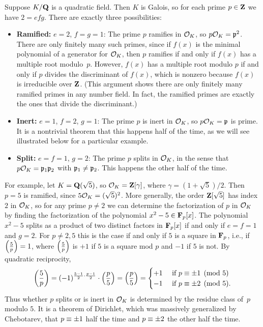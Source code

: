 Suppose $K/\mathbf{Q}$ is a quadratic field.  Then $K$ is Galois, so for each prime $p\in\mathbf{Z}$ we have
$2=efg$. There are exactly three possibilities:
\begin{itemize}
\item {\bf Ramified:} $e=2$, $f=g=1$: The prime $p$ ramifies in
  $\mathcal{O}_K$, so $p\mathcal{O}_K = \mathfrak{p}^2$.  There are only finitely many such
  primes, since if $f(x)$ is the minimal polynomial of a generator for
  $\mathcal{O}_K$, then $p$ ramifies if and only if $f(x)$ has a multiple root
  modulo~$p$.  However, $f(x)$ has a multiple root modulo $p$ if and
  only if $p$ divides the discriminant of $f(x)$, which is nonzero
  because $f(x)$ is irreducible over $\mathbf{Z}$.  (This argument shows there
  are only finitely many ramified primes in any number field.  In
  fact, the ramified primes are exactly the
  ones that divide the discriminant.)
\item {\bf Inert:} $e=1$, $f=2$, $g=1$: The prime $p$ is inert in $\mathcal{O}_K$, so 
$p\mathcal{O}_K = \mathfrak{p}$ is prime.  It is a nontrivial theorem that 
this happens half of the time,
as we will see illustrated below for a particular example.
\item {\bf Split:} $e=f=1$, $g=2$: The prime $p$ splits in $\mathcal{O}_K$, in the
sense that $p\mathcal{O}_K = \mathfrak{p}_1\mathfrak{p}_2$ with $\mathfrak{p}_1\neq \mathfrak{p}_2$.  This happens the other
half of the time. 
\end{itemize}
For example, let $K=\mathbf{Q}(\sqrt{5})$, so $\mathcal{O}_K=\mathbf{Z}[\gamma]$, where
$\gamma=(1+\sqrt{5})/2$.  Then $p=5$ is ramified, since $5\mathcal{O}_K =
(\sqrt{5})^2$.  More generally, the order $\mathbf{Z}[\sqrt{5}]$ has index $2$
in $\mathcal{O}_K$, so for any prime $p\neq 2$ we can determine the
factorization of $p$ in $\mathcal{O}_K$ by finding the factorization of the
polynomial $x^2-5\in \mathbf{F}_p[x]$.  The polynomial $x^2-5$ splits as a
product of two distinct factors in $\mathbf{F}_p[x]$ if and only if $e=f=1$
and $g=2$.  For $p\neq 2,5$ this is the case if and only if $5$ is a
square in $\mathbf{F}_p$, i.e., if $\left(\frac{5}{p}\right) = 1$, where $\left(\frac{5}{p}\right)$ is $+1$
if $5$ is a square mod $p$ and $-1$ if $5$ is not.  By quadratic
reciprocity,
$$
 \left(\frac{5}{p}\right) = (-1)^{\frac{5-1}{2}\cdot \frac{p-1}{2}} \cdot \left(\frac{p}{5}\right) = 
   \left(\frac{p}{5}\right) = \begin{cases} +1 & \text{ if } p\equiv \pm 1\pmod{5}\\ -1&\text{ if } p \equiv \pm 2\pmod{5}.\end{cases}
$$
Thus whether $p$ splits or is inert in 
$\mathcal{O}_K$ is determined by the residue class of~$p$ 
modulo $5$.  It is a theorem of Dirichlet, which was massively
generalized by Chebotarev, that $p\equiv \pm 1$ half the time
and $p \equiv \pm 2$ the other half the time. 

